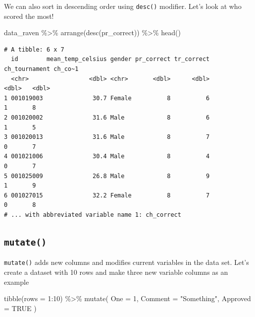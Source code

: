 \documentclass[
  letterpaper,
]{book}
\newenvironment{Shaded}{\begin{snugshade}}{\end{snugshade}}
\newcommand{\AttributeTok}[1]{\textcolor[rgb]{0.40,0.45,0.13}{#1}}
\newcommand{\ConstantTok}[1]{\textcolor[rgb]{0.56,0.35,0.01}{#1}}
\newcommand{\DecValTok}[1]{\textcolor[rgb]{0.68,0.00,0.00}{#1}}
\newcommand{\FunctionTok}[1]{\textcolor[rgb]{0.28,0.35,0.67}{#1}}
\newcommand{\NormalTok}[1]{\textcolor[rgb]{0.00,0.23,0.31}{#1}}
\newcommand{\SpecialCharTok}[1]{\textcolor[rgb]{0.37,0.37,0.37}{#1}}
\newcommand{\StringTok}[1]{\textcolor[rgb]{0.13,0.47,0.30}{#1}}
\begin{document}
We can also sort in descending order using \texttt{desc()} modifier.
Let's look at who scored the most!

\begin{Shaded}
\begin{Highlighting}[]
\NormalTok{data\_raven }\SpecialCharTok{\%\textgreater{}\%} \FunctionTok{arrange}\NormalTok{(}\FunctionTok{desc}\NormalTok{(pr\_correct)) }\SpecialCharTok{\%\textgreater{}\%} \FunctionTok{head}\NormalTok{()}
\end{Highlighting}
\end{Shaded}

\begin{verbatim}
# A tibble: 6 x 7
  id        mean_temp_celsius gender pr_correct tr_correct ch_tournament ch_co~1
  <chr>                 <dbl> <chr>       <dbl>      <dbl>         <dbl>   <dbl>
1 001019003              30.7 Female          8          6             1       8
2 001020002              31.6 Male            8          6             1       5
3 001020013              31.6 Male            8          7             0       7
4 001021006              30.4 Male            8          4             0       7
5 001025009              26.8 Male            8          9             1       9
6 001027015              32.2 Female          8          7             0       8
# ... with abbreviated variable name 1: ch_correct
\end{verbatim}

\hypertarget{mutate}{%
\subsection{\texorpdfstring{\texttt{mutate()}}{mutate()}}\label{mutate}}

\texttt{mutate()} adds new columns and modifies current variables in the
data set. Let's create a dataset with 10 rows and make three new
variable columns as an example

\begin{Shaded}
\begin{Highlighting}[]
\FunctionTok{tibble}\NormalTok{(}\AttributeTok{rows =} \DecValTok{1}\SpecialCharTok{:}\DecValTok{10}\NormalTok{) }\SpecialCharTok{\%\textgreater{}\%} \FunctionTok{mutate}\NormalTok{(}
  \AttributeTok{One =} \DecValTok{1}\NormalTok{,}
  \AttributeTok{Comment =} \StringTok{"Something"}\NormalTok{,}
  \AttributeTok{Approved =} \ConstantTok{TRUE}
\NormalTok{)}
\end{Highlighting}
\end{Shaded}
\end{document}
